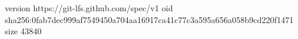 version https://git-lfs.github.com/spec/v1
oid sha256:0fab7dec999af7549450a704aa16917ca41c77c3a595a656a058b9cd220f1471
size 43840
